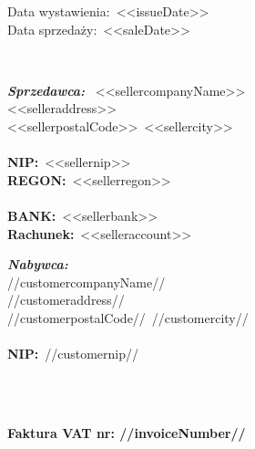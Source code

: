 \documentclass[12pt]{article}
\newcommand{\nipText}{\textbf{NIP:}}
\newcommand{\regonText}{\textbf{REGON:}}
\newcommand{\bankText}{\textbf{BANK:}}
\newcommand{\accountText}{\textbf{Rachunek:}}
\begin{document}
    \begin{footnotesize}
        \begin{flushright}
            \begin{minipage}[t]{.4\textwidth}
                Data wystawienia:~<<issueDate>> \\
                Data sprzedaży:~<<saleDate>>
            \end{minipage}
        \end{flushright}
    \end{footnotesize}

    \ \\

    \begin{small}
        \begin{minipage}[t]{.6\textwidth}
            \textbf{\emph{Sprzedawca:}} \
            <<sellercompanyName>> \\
            <<selleraddress>> \\
            <<sellerpostalCode>>~<<sellercity>> \\ \\
            \nipText~<<sellernip>> \\
            \regonText~<<sellerregon>> \\ \\
            \bankText~<<sellerbank>> \\
            \accountText~<<selleraccount>>
        \end{minipage}
        \begin{minipage}[t]{\textwidth}
            \textbf{\emph{Nabywca:}} \\
            //customercompanyName// \\
            //customeraddress// \\
            //customerpostalCode//~//customercity// \\ \\
            \nipText~//customernip//
        \end{minipage}
    \end{small}

    \ \\ \ \\

    \centerline{\textbf{\LARGE{Faktura VAT nr: //invoiceNumber//}}}

    \ \\
\end{document}
